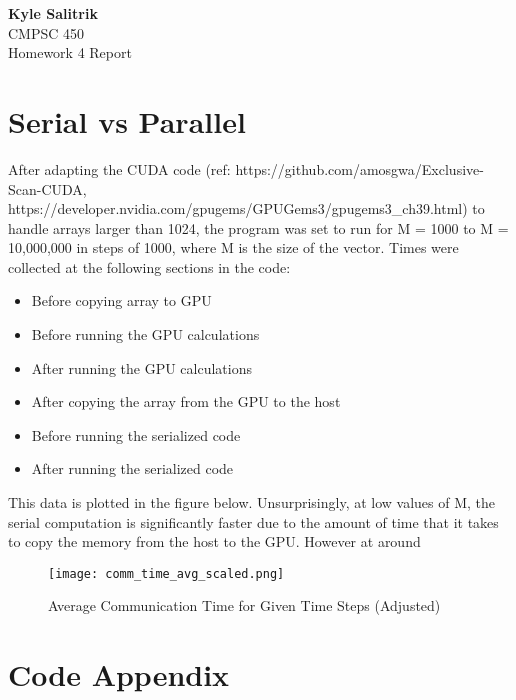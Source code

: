 \documentclass[a4paper, 11pt]{article}
\begin{document}
\graphicspath{{./figures/}}
\noindent
\large\textbf{Kyle Salitrik} \\
\normalsize CMPSC 450\\
\large{Homework 4 Report} \hfill 

\section*{Serial vs Parallel}
After adapting the CUDA code (ref: https://github.com/amosgwa/Exclusive-Scan-CUDA, https://developer.nvidia.com/gpugems/GPUGems3/gpugems3_ch39.html) to handle arrays larger than 1024, the program was set to run for M = 1000 to M = 10,000,000 in steps of 1000, where M is the size of the vector. Times were collected at the following sections in the code:
\begin{itemize}
	\item Before copying array to GPU
	\item Before running the GPU calculations
	\item After running the GPU calculations
	\item After copying the array from the GPU to the host
	\item Before running the serialized code
	\item After running the serialized code
\end{itemize}

This data is plotted in the figure below. Unsurprisingly, at low values of M, the serial computation is significantly faster due to the amount of time that it takes to copy the memory from the host to the GPU. However at around

\begin{figure}[H]
	\centering
	\centerline{\texttt{[image: comm\_time\_avg\_scaled.png]}}
	\caption{Average Communication Time for Given Time Steps (Adjusted)}
\end{figure}





\newpage
\section*{Code Appendix}

\end{document}

